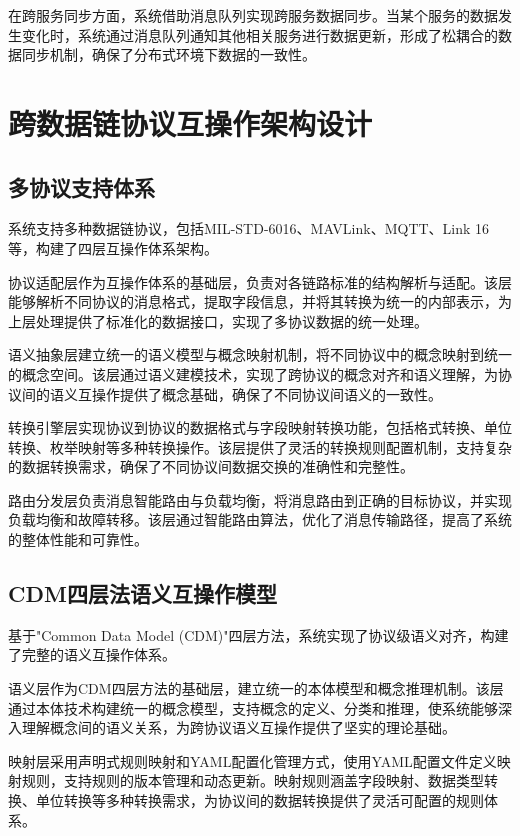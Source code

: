 在跨服务同步方面，系统借助消息队列实现跨服务数据同步。当某个服务的数据发生变化时，系统通过消息队列通知其他相关服务进行数据更新，形成了松耦合的数据同步机制，确保了分布式环境下数据的一致性。

\section{跨数据链协议互操作架构设计}

\subsection{多协议支持体系}

系统支持多种数据链协议，包括MIL-STD-6016、MAVLink、MQTT、Link 16等，构建了四层互操作体系架构。

协议适配层作为互操作体系的基础层，负责对各链路标准的结构解析与适配。该层能够解析不同协议的消息格式，提取字段信息，并将其转换为统一的内部表示，为上层处理提供了标准化的数据接口，实现了多协议数据的统一处理。

语义抽象层建立统一的语义模型与概念映射机制，将不同协议中的概念映射到统一的概念空间。该层通过语义建模技术，实现了跨协议的概念对齐和语义理解，为协议间的语义互操作提供了概念基础，确保了不同协议间语义的一致性。

转换引擎层实现协议到协议的数据格式与字段映射转换功能，包括格式转换、单位转换、枚举映射等多种转换操作。该层提供了灵活的转换规则配置机制，支持复杂的数据转换需求，确保了不同协议间数据交换的准确性和完整性。

路由分发层负责消息智能路由与负载均衡，将消息路由到正确的目标协议，并实现负载均衡和故障转移。该层通过智能路由算法，优化了消息传输路径，提高了系统的整体性能和可靠性。

\subsection{CDM四层法语义互操作模型}

基于"Common Data Model (CDM)"四层方法，系统实现了协议级语义对齐，构建了完整的语义互操作体系。

语义层作为CDM四层方法的基础层，建立统一的本体模型和概念推理机制。该层通过本体技术构建统一的概念模型，支持概念的定义、分类和推理，使系统能够深入理解概念间的语义关系，为跨协议语义互操作提供了坚实的理论基础。

映射层采用声明式规则映射和YAML配置化管理方式，使用YAML配置文件定义映射规则，支持规则的版本管理和动态更新。映射规则涵盖字段映射、数据类型转换、单位转换等多种转换需求，为协议间的数据转换提供了灵活可配置的规则体系。


